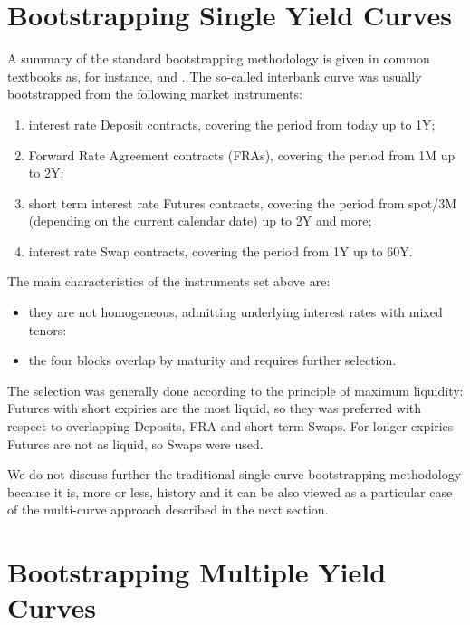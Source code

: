 \documentclass[11pt,reqno]{amsart}
\begin{document}
\section{Bootstrapping Single Yield Curves}
\label{sec:SingleBootstrapping}
A summary of the standard bootstrapping methodology is given in common textbooks as, for instance, \cite{Hul08} and \cite{Reb1998}. The so-called interbank curve was usually bootstrapped from the following market instruments:
\begin{enumerate}
\item interest rate Deposit contracts, covering the period from today up to 1Y;
\item Forward Rate Agreement contracts (FRAs), covering the period from 1M up to 2Y;
\item short term interest rate Futures contracts, covering the period from spot/3M (depending on the current calendar date) up to 2Y and more;
\item interest rate Swap contracts, covering the period from 1Y up to 60Y.
\end{enumerate}
The main characteristics of the instruments set above are:
\begin{itemize}
  \item they are not homogeneous, admitting underlying interest rates with mixed tenors:
  \item the four blocks overlap by maturity and requires further selection.
\end{itemize}
The selection was generally done according to the principle of maximum liquidity: Futures with short expiries are the most liquid, so they was preferred with respect to overlapping Deposits, FRA and short term Swaps. For longer expiries Futures are not as liquid, so Swaps were used.
\par
We do not discuss further the traditional single curve bootstrapping methodology because it is, more or less, history and it can be also viewed as a particular case of the multi-curve approach described in the next section.

\section{Bootstrapping Multiple Yield Curves}
\label{sec:MultiBootstrapping}
\end{document}
